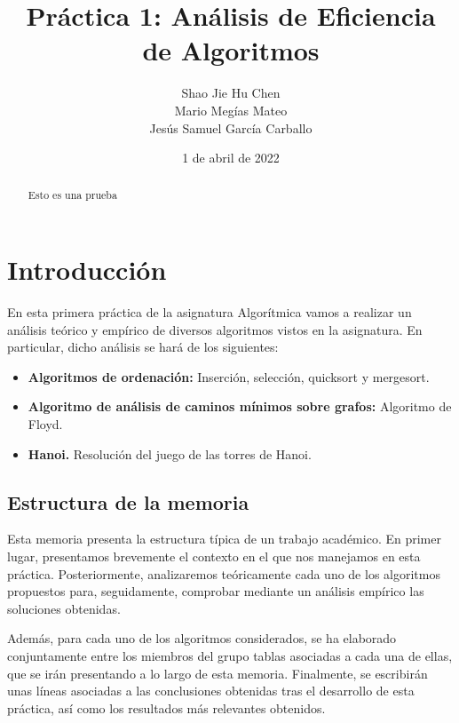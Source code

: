 \documentclass{homework}
\title{Práctica 1: Análisis de Eficiencia de Algoritmos}
\author{Shao Jie Hu Chen \\ Mario Megías Mateo \\ Jesús Samuel García Carballo}
\date{1 de abril de 2022}
\begin{document}
	\maketitle

    \newpage

    \begin{abstract}
		Esto es una prueba
	\end{abstract}
	
    \newpage

	\tableofcontents
	\newpage
	\setcounter{page}{1}
	
	\section{Introducción}

    En esta primera práctica de la asignatura Algorítmica vamos a realizar un análisis teórico y empírico de
    diversos algoritmos vistos en la asignatura. En particular, dicho análisis se hará de los siguientes:

    \begin{itemize}
        \item \textbf{Algoritmos de ordenación:} Inserción, selección, quicksort y mergesort. 
        \item \textbf{Algoritmo de análisis de caminos mínimos sobre grafos:} Algoritmo de Floyd.
        \item \textbf{Hanoi.} Resolución del juego de las torres de Hanoi. 
    \end{itemize}

    \subsection{Estructura de la memoria}
    
	Esta memoria presenta la estructura típica de un trabajo académico. En primer lugar, presentamos
    brevemente el contexto en el que nos manejamos en esta práctica. Posteriormente, analizaremos teóricamente
    cada uno de los algoritmos propuestos para, seguidamente, comprobar mediante un 
    análisis empírico las soluciones obtenidas. 
    
    Además, para cada uno de los algoritmos considerados, se ha
    elaborado conjuntamente entre los miembros del grupo tablas asociadas a cada una de ellas, que se
    irán presentando a lo largo de esta memoria. Finalmente, se escribirán unas
    líneas asociadas a las conclusiones obtenidas tras el desarrollo de esta práctica, así como los resultados
    más relevantes obtenidos. 
\end{document}
